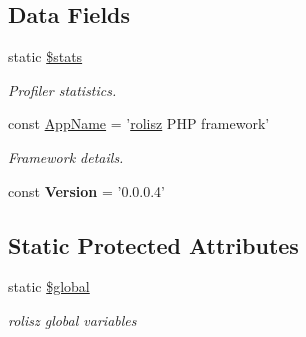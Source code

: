 \subsection*{Data Fields}
\begin{DoxyCompactItemize}
\item 
\hypertarget{classbase_ac61adefb58583938c9b820405ddfa018}{
static \hyperlink{classbase_ac61adefb58583938c9b820405ddfa018}{\$stats}}
\label{classbase_ac61adefb58583938c9b820405ddfa018}

\begin{DoxyCompactList}\small\item\em Profiler statistics. \item\end{DoxyCompactList}\end{DoxyCompactItemize}
{\bf }\par
\begin{DoxyCompactItemize}
\item 
\hypertarget{classbase_aab75444b144ffc4e972a9170e0a76ec0}{
const \hyperlink{classbase_aab75444b144ffc4e972a9170e0a76ec0}{AppName} = '\hyperlink{classrolisz}{rolisz} PHP framework'}
\label{classbase_aab75444b144ffc4e972a9170e0a76ec0}

\begin{DoxyCompactList}\small\item\em Framework details. \item\end{DoxyCompactList}\item 
\hypertarget{classbase_a62e44de9100d83ee01f5b4875b49a02b}{
const {\bfseries Version} = '0.0.0.4'}
\label{classbase_a62e44de9100d83ee01f5b4875b49a02b}

\end{DoxyCompactItemize}

\subsection*{Static Protected Attributes}
\begin{DoxyCompactItemize}
\item 
\hypertarget{classbase_aad844777d9d6beb4ca7c92d97afe7d27}{
static \hyperlink{classbase_aad844777d9d6beb4ca7c92d97afe7d27}{\$global}}
\label{classbase_aad844777d9d6beb4ca7c92d97afe7d27}

\begin{DoxyCompactList}\small\item\em rolisz global variables \item\end{DoxyCompactList}\end{DoxyCompactItemize}



